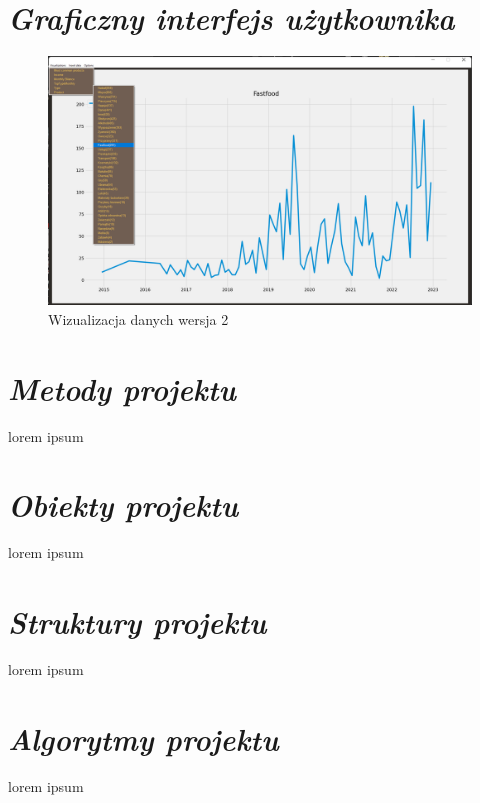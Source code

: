 \documentclass[a4paper,10pt]{report}
\newcommand{\customstylesection}[1]{\textbf{\textit{#1}}}
\begin{document}

\section{\customstylesection{Graficzny interfejs użytkownika}} \label{GUI}

\begin{figure}[H]           %
    \caption{Wizualizacja danych wersja 2}
    \label{fig:Wizualizacja danych wersja 2}
    \centering  
    \includegraphics[width=12cm]{figures/Interface_v0.2.png}
\end{figure}
\section{\customstylesection{Metody projektu}}
{lorem ipsum}

\section{\customstylesection{Obiekty projektu}}
{lorem ipsum}

\section{\customstylesection{Struktury projektu}}
{lorem ipsum}

\section{\customstylesection{Algorytmy projektu}}
{lorem ipsum}
\end{document}
